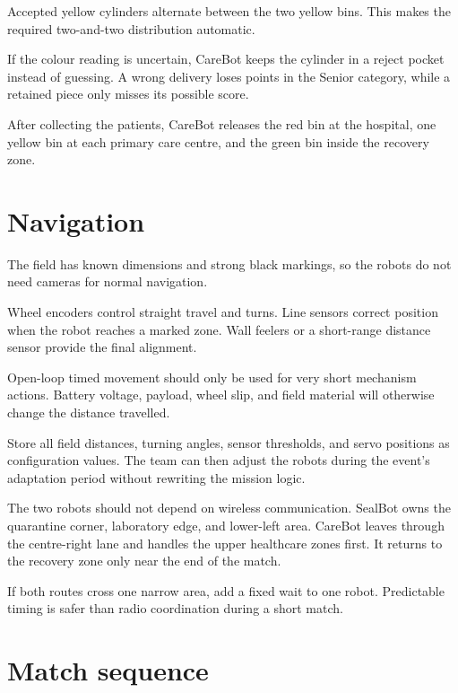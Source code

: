 \documentclass[11pt,a4paper]{article}
\begin{document}
Accepted yellow cylinders alternate between the two yellow bins. This makes the required two-and-two distribution automatic.

If the colour reading is uncertain, CareBot keeps the cylinder in a reject pocket instead of guessing. A wrong delivery loses points in the Senior category, while a retained piece only misses its possible score.

After collecting the patients, CareBot releases the red bin at the hospital, one yellow bin at each primary care centre, and the green bin inside the recovery zone.

\section{Navigation}

The field has known dimensions and strong black markings, so the robots do not need cameras for normal navigation.

Wheel encoders control straight travel and turns. Line sensors correct position when the robot reaches a marked zone. Wall feelers or a short-range distance sensor provide the final alignment.

Open-loop timed movement should only be used for very short mechanism actions. Battery voltage, payload, wheel slip, and field material will otherwise change the distance travelled.

Store all field distances, turning angles, sensor thresholds, and servo positions as configuration values. The team can then adjust the robots during the event's adaptation period without rewriting the mission logic.

The two robots should not depend on wireless communication. SealBot owns the quarantine corner, laboratory edge, and lower-left area. CareBot leaves through the centre-right lane and handles the upper healthcare zones first. It returns to the recovery zone only near the end of the match.

If both routes cross one narrow area, add a fixed wait to one robot. Predictable timing is safer than radio coordination during a short match.

\section{Match sequence}
\end{document}
